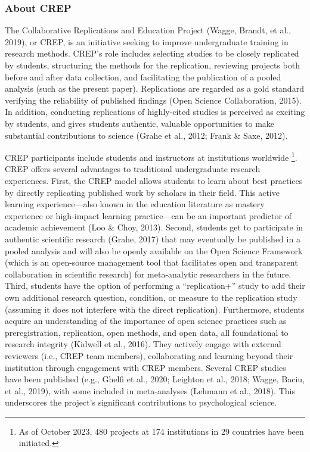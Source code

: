 \documentclass[
]{article}
\begin{document}
\subsubsection{About CREP}\label{about-crep}

The Collaborative Replications and Education Project (Wagge, Brandt, et
al., 2019), or CREP, is an initiative seeking to improve undergraduate
training in research methods. CREP's role includes selecting studies to
be closely replicated by students, structuring the methods for the
replication, reviewing projects both before and after data collection,
and facilitating the publication of a pooled analysis (such as the
present paper). Replications are regarded as a gold standard verifying
the reliability of published findings (Open Science Collaboration,
2015). In addition, conducting replications of highly-cited studies is
perceived as exciting by students, and gives students authentic,
valuable opportunities to make substantial contributions to science
(Grahe et al., 2012; Frank \& Saxe, 2012).

CREP participants include students and instructors at institutions
worldwide \footnote{As of October 2023, 480 projects at 174 institutions
  in 29 countries have been initiated.}. CREP offers several advantages
to traditional undergraduate research experiences. First, the CREP model
allows students to learn about best practices by directly replicating
published work by scholars in their field. This active learning
experience---also known in the education literature as mastery
experience or high-impact learning practice---can be an important
predictor of academic achievement (Loo \& Choy, 2013). Second, students
get to participate in authentic scientific research (Grahe, 2017) that
may eventually be published in a pooled analysis and will also be openly
available on the Open Science Framework (which is an open-source
management tool that facilitates open and transparent collaboration in
scientific research) for meta-analytic researchers in the future. Third,
students have the option of performing a ``replication+'' study to add
their own additional research question, condition, or measure to the
replication study (assuming it does not interfere with the direct
replication). Furthermore, students acquire an understanding of the
importance of open science practices such as preregistration,
replication, open methods, and open data, all foundational to research
integrity (Kidwell et al., 2016). They actively engage with external
reviewers (i.e., CREP team members), collaborating and learning beyond
their institution through engagement with CREP members. Several CREP
studies have been published (e.g., Ghelfi et al., 2020; Leighton et al.,
2018; Wagge, Baciu, et al., 2019), with some included in meta-analyses
(Lehmann et al., 2018). This underscores the project's significant
contributions to psychological science.
\end{document}

